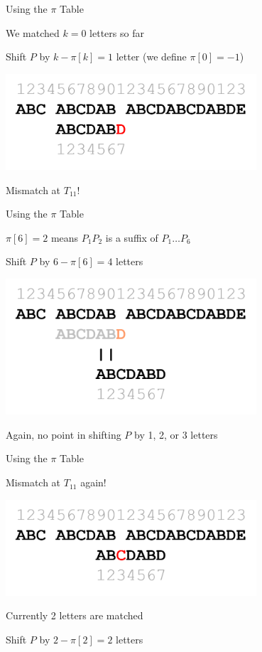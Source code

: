 \documentclass[13pt,onlymath]{beamer}
\begin{document}
\begin{frame}{Using the $\pi$ Table}
\BIT
\item We matched $k=0$ letters so far
\item Shift $P$ by $k-\pi[k] = 1$ letter (we define $\pi[0] = -1$)
\begin{center}
\includegraphics[width=0.7\textwidth]{figures/kmp3}
\end{center}
\item Mismatch at $T_{11}$!
\EIT
\end{frame}

\begin{frame}{Using the $\pi$ Table}
\BIT
\item $\pi[6]=2$ means $P_1 P_2$ is a suffix of $P_1 \ldots P_6$
\item Shift $P$ by $6 - \pi[6] = 4$ letters
\begin{center}
\includegraphics[width=0.7\textwidth]{figures/kmp4}
\end{center}
\item Again, no point in shifting $P$ by 1, 2, or 3 letters
\EIT
\end{frame}

\begin{frame}{Using the $\pi$ Table}
\BIT
\item Mismatch at $T_{11}$ again!
\begin{center}
\includegraphics[width=0.7\textwidth]{figures/kmp5}
\end{center}
\item Currently 2 letters are matched
\item Shift $P$ by $2-\pi[2] = 2$ letters
\EIT
\end{frame}
\end{document}
